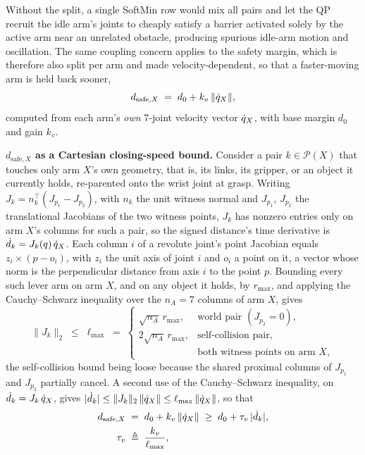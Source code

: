 Without the split, a single SoftMin row would mix all pairs and let the QP recruit the idle arm's joints to cheaply satisfy a barrier activated solely by the active arm near an unrelated obstacle, producing spurious idle-arm motion and oscillation. The same coupling concern applies to the safety margin, which is therefore also split per arm and made velocity-dependent, so that a faster-moving arm is held back sooner,
\begin{equation}
d_{\text{safe},X} \;=\; d_0 + k_v\,\|\dot{q}_X\|,
\label{eq:dsafe}
\end{equation}
computed from each arm's \emph{own} 7-joint velocity vector $\dot{q}_X$, with base margin $d_0$ and gain $k_v$.

\textbf{$d_{\text{safe},X}$ as a Cartesian closing-speed bound.} Consider a pair $k \in \mathcal{P}(X)$ that touches only arm $X$'s own geometry, that is, its links, its gripper, or an object it currently holds, re-parented onto the wrist joint at grasp. Writing $J_k = n_k^{\top}(J_{p_1} - J_{p_2})$, with $n_k$ the unit witness normal and $J_{p_1}$, $J_{p_2}$ the translational Jacobians of the two witness points, $J_k$ has nonzero entries only on arm $X$'s columns for such a pair, so the signed distance's time derivative is $\dot{d}_k = J_k(q)\,\dot{q}_X$. Each column $i$ of a revolute joint's point Jacobian equals $z_i \times (p - o_i)$, with $z_i$ the unit axis of joint $i$ and $o_i$ a point on it, a vector whose norm is the perpendicular distance from axis $i$ to the point $p$. Bounding every such lever arm on arm $X$, and on any object it holds, by $r_{\max}$, and applying the Cauchy--Schwarz inequality over the $n_A = 7$ columns of arm $X$, gives
\begin{equation}
\|J_k\|_2 \;\le\; \ell_{\max} \;=\;
\begin{cases}
\sqrt{n_A}\,r_{\max}, & \text{world pair } (J_{p_2} = 0),\\[2pt]
2\sqrt{n_A}\,r_{\max}, & \text{self-collision pair,}\\
 & \text{both witness points on arm } X,
\end{cases}
\label{eq:lmax}
\end{equation}
the self-collision bound being loose because the shared proximal columns of $J_{p_1}$ and $J_{p_2}$ partially cancel. A second use of the Cauchy--Schwarz inequality, on $\dot{d}_k = J_k\,\dot{q}_X$, gives $|\dot{d}_k| \le \|J_k\|_2\,\|\dot{q}_X\| \le \ell_{\max}\,\|\dot{q}_X\|$, so that
\begin{equation}
\begin{split}
d_{\text{safe},X} &\;=\; d_0 + k_v\,\|\dot{q}_X\| \;\ge\; d_0 + \tau_v\,|\dot{d}_k|, \\
\tau_v &\;\triangleq\; \frac{k_v}{\ell_{\max}},
\end{split}
\label{eq:tauv}
\end{equation}
